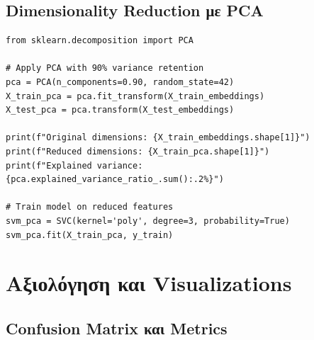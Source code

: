 \documentclass[12pt,a4paper,twoside]{book}
\begin{document}
\subsection{Dimensionality Reduction με PCA}

\begin{tcolorbox}[myCustomStyle={PCA Application}]
    \begin{lstlisting}[style=myPythonStyle]
from sklearn.decomposition import PCA

# Apply PCA with 90% variance retention
pca = PCA(n_components=0.90, random_state=42)
X_train_pca = pca.fit_transform(X_train_embeddings)
X_test_pca = pca.transform(X_test_embeddings)

print(f"Original dimensions: {X_train_embeddings.shape[1]}")
print(f"Reduced dimensions: {X_train_pca.shape[1]}")
print(f"Explained variance: {pca.explained_variance_ratio_.sum():.2%}")

# Train model on reduced features
svm_pca = SVC(kernel='poly', degree=3, probability=True)
svm_pca.fit(X_train_pca, y_train)
\end{lstlisting}
\end{tcolorbox}

\section{Αξιολόγηση και Visualizations}

\subsection{Confusion Matrix και Metrics}
\end{document}
